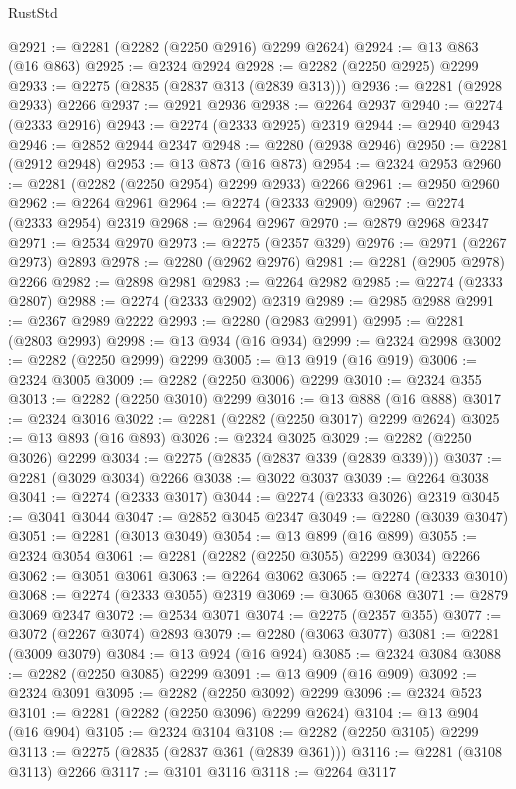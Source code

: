 \begin{lexlean}{RustStd}
\begin{coremodule}
{\begin{coremodule}
{{{{{{{{{{{{{{@2921 := @2281 (@2282 (@2250 @2916) @2299 @2624)
@2924 := @13 @863 (@16 @863)
@2925 := @2324 @2924
@2928 := @2282 (@2250 @2925) @2299
@2933 := @2275 (@2835 (@2837 @313 (@2839 @313)))
@2936 := @2281 (@2928 @2933) @2266
@2937 := @2921 @2936
@2938 := @2264 @2937
@2940 := @2274 (@2333 @2916)
@2943 := @2274 (@2333 @2925) @2319
@2944 := @2940 @2943
@2946 := @2852 @2944 @2347
@2948 := @2280 (@2938 @2946)
@2950 := @2281 (@2912 @2948)
@2953 := @13 @873 (@16 @873)
@2954 := @2324 @2953
@2960 := @2281 (@2282 (@2250 @2954) @2299 @2933) @2266
@2961 := @2950 @2960
@2962 := @2264 @2961
@2964 := @2274 (@2333 @2909)
@2967 := @2274 (@2333 @2954) @2319
@2968 := @2964 @2967
@2970 := @2879 @2968 @2347
@2971 := @2534 @2970
@2973 := @2275 (@2357 @329)
@2976 := @2971 (@2267 @2973) @2893
@2978 := @2280 (@2962 @2976)
@2981 := @2281 (@2905 @2978) @2266
@2982 := @2898 @2981
@2983 := @2264 @2982
@2985 := @2274 (@2333 @2807)
@2988 := @2274 (@2333 @2902) @2319
@2989 := @2985 @2988
@2991 := @2367 @2989 @2222
@2993 := @2280 (@2983 @2991)
@2995 := @2281 (@2803 @2993)
@2998 := @13 @934 (@16 @934)
@2999 := @2324 @2998
@3002 := @2282 (@2250 @2999) @2299
@3005 := @13 @919 (@16 @919)
@3006 := @2324 @3005
@3009 := @2282 (@2250 @3006) @2299
@3010 := @2324 @355
@3013 := @2282 (@2250 @3010) @2299
@3016 := @13 @888 (@16 @888)
@3017 := @2324 @3016
@3022 := @2281 (@2282 (@2250 @3017) @2299 @2624)
@3025 := @13 @893 (@16 @893)
@3026 := @2324 @3025
@3029 := @2282 (@2250 @3026) @2299
@3034 := @2275 (@2835 (@2837 @339 (@2839 @339)))
@3037 := @2281 (@3029 @3034) @2266
@3038 := @3022 @3037
@3039 := @2264 @3038
@3041 := @2274 (@2333 @3017)
@3044 := @2274 (@2333 @3026) @2319
@3045 := @3041 @3044
@3047 := @2852 @3045 @2347
@3049 := @2280 (@3039 @3047)
@3051 := @2281 (@3013 @3049)
@3054 := @13 @899 (@16 @899)
@3055 := @2324 @3054
@3061 := @2281 (@2282 (@2250 @3055) @2299 @3034) @2266
@3062 := @3051 @3061
@3063 := @2264 @3062
@3065 := @2274 (@2333 @3010)
@3068 := @2274 (@2333 @3055) @2319
@3069 := @3065 @3068
@3071 := @2879 @3069 @2347
@3072 := @2534 @3071
@3074 := @2275 (@2357 @355)
@3077 := @3072 (@2267 @3074) @2893
@3079 := @2280 (@3063 @3077)
@3081 := @2281 (@3009 @3079)
@3084 := @13 @924 (@16 @924)
@3085 := @2324 @3084
@3088 := @2282 (@2250 @3085) @2299
@3091 := @13 @909 (@16 @909)
@3092 := @2324 @3091
@3095 := @2282 (@2250 @3092) @2299
@3096 := @2324 @523
@3101 := @2281 (@2282 (@2250 @3096) @2299 @2624)
@3104 := @13 @904 (@16 @904)
@3105 := @2324 @3104
@3108 := @2282 (@2250 @3105) @2299
@3113 := @2275 (@2835 (@2837 @361 (@2839 @361)))
@3116 := @2281 (@3108 @3113) @2266
@3117 := @3101 @3116
@3118 := @2264 @3117
}}}}}}}}}}}}}}
\end{coremodule}}
\end{coremodule}
\end{lexlean}
